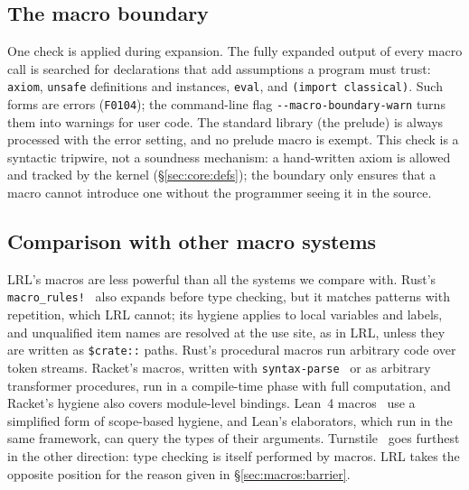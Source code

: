 \subsection{The macro boundary}\label{sec:macros:boundary}

One check is applied during expansion.
The fully expanded output of every macro call is searched for declarations that add assumptions a program must trust: \lstinline|axiom|, \lstinline|unsafe| definitions and instances, \lstinline|eval|, and \lstinline|(import classical)|.
Such forms are errors (\texttt{F0104}); the command-line flag \texttt{-{}-macro-boundary-warn} turns them into warnings for user code.
The standard library (the prelude) is always processed with the error setting, and no prelude macro is exempt.
This check is a syntactic tripwire, not a soundness mechanism: a hand-written axiom is allowed and tracked by the kernel (\S\ref{sec:core:defs}); the boundary only ensures that a macro cannot introduce one without the programmer seeing it in the source.

\subsection{Comparison with other macro systems}\label{sec:macros:compare}

LRL's macros are less powerful than all the systems we compare with.
Rust's \lstinline|macro_rules!|~\cite{rustmacros} also expands before type checking, but it matches patterns with repetition, which LRL cannot; its hygiene applies to local variables and labels, and unqualified item names are resolved at the use site, as in LRL, unless they are written as \lstinline|$crate::| paths.
Rust's procedural macros run arbitrary code over token streams.
Racket's macros, written with \lstinline|syntax-parse|~\cite{culpepper2010} or as arbitrary transformer procedures, run in a compile-time phase with full computation, and Racket's hygiene also covers module-level bindings.
Lean~4 macros~\cite{ullrich2022} use a simplified form of scope-based hygiene, and Lean's elaborators, which run in the same framework, can query the types of their arguments.
Turnstile~\cite{chang2017turnstile,chang2020dependent} goes furthest in the other direction: type checking is itself performed by macros.
LRL takes the opposite position for the reason given in \S\ref{sec:macros:barrier}.
